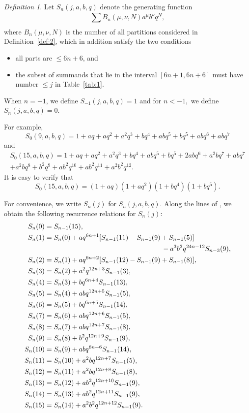 \documentclass[12pt,twoside]{amsart}
\theoremstyle{remark}
\newtheorem{Definition}{Definition}
\numberwithin{equation}{section}
\begin{document}
\begin{Definition}\label{def:3}
Let $S_n(j,a,b,q)$ denote the generating function
$$
\sum _{} ^{}B_n(\mu,\nu,N)a^\mu b^\nu q^N,$$
where $B_n(\mu,\nu,N)$ is the number of all
partitions considered in Definition~\ref{def:2}, which in
addition satisfy the two conditions
\begin{itemize}
\item [(vi)] all parts are $\leq 6n+6$, and
\item[(vii)] the subset of summands
that lie in the interval $[6n+1, 6n+6]$ must have number $\leq j$
in Table~\ref{tab:1}.
\end{itemize}
When $n = -1$, we define $ S_{-1}(j,a,b,q) = 1 $ and for
$ n < -1,$ we define $ S_n(j,a,b,q) = 0. $
\end{Definition}

For example,
$$
S_0(9,a,b,q) = 1+aq+aq^2+a^2q^3+bq^4+abq^5+bq^5+abq^6+abq^7 $$
and
\begin{multline*}
 S_0(15,a,b,q) =
1+aq+aq^2+a^2q^3+bq^4+abq^5+bq^5+2abq^6+a^2bq^7+abq^7\\
+a^2bq^8+b^2q^9
 +ab^2q^{10}+ab^2q^{11}+a^2b^2q^{12}.
\end{multline*}
 It is easy to verify that
$$ S_0(15,a,b,q) =
(1+aq)(1+aq^2)(1+bq^4)(1+bq^5) .$$

For convenience, we write
$S_n(j)$ for $S_n(j,a,b,q)$. Along the lines of \cite{R3}, we obtain
the following recurrence relations for $S_n(j)$:
\begin{align} \label{eq:16}
S_n(0)&=S_{n-1}(15),\\
\label{eq:17} S_n(1) &=
S_n(0)+aq^{6n+1}[S_{n-1}(11)-S_{n-1}(9)+S_{n-1}(5)]\\
\notag
&\kern6cm
-a^3b^3q^{24n-12}S_{n-3}(9),\\
\label{eq:18} S_n(2) &=
S_n(1)+aq^{6n+2}[S_{n-1}(12)-S_{n-1}(9)+S_{n-1}(8)], \\
\label{eq:19} S_n(3) &= S_n(2)+a^2q^{12n+3}S_{n-1}(3),\\
\label{eq:20} S_n(4) &= S_n(3)+bq^{6n+4}S_{n-1}(13), \\
\label{eq:21} S_n(5) &= S_n(4)+abq^{12n+5}S_{n-1}(5), \\
\label{eq:22} S_n(6) &= S_n(5)+bq^{6n+5}S_{n-1}(14), \\
\label{eq:23} S_n(7) &= S_n(6)+abq^{12n+6}S_{n-1}(5), \\
\label{eq:24} S_n(8) &= S_n(7)+abq^{12n+7}S_{n-1}(8), \\
\label{eq:25} S_n(9) &= S_n(8)+b^2q^{12n+9}S_{n-1}(9), \\
\label{eq:26} S_n(10)&= S_n(9)+abq^{6n+6}S_{n-1}(14), \\
\label{eq:27} S_n(11) &= S_n(10)+a^2bq^{12n+7}S_{n-1}(5), \\
\label{eq:28} S_n(12) &= S_n(11)+a^2bq^{12n+8}S_{n-1}(8), \\
\label{eq:29} S_n(13) &= S_n(12)+ab^2q^{12n+10}S_{n-1}(9),\\
\label{eq:30} S_n(14) &= S_n(13)+ab^2q^{12n+11}S_{n-1}(9), \\
\label{eq:31} S_n(15) &= S_n(14)+a^2b^2q^{12n+12}S_{n-1}(9).
\end{align}
\end{document}
